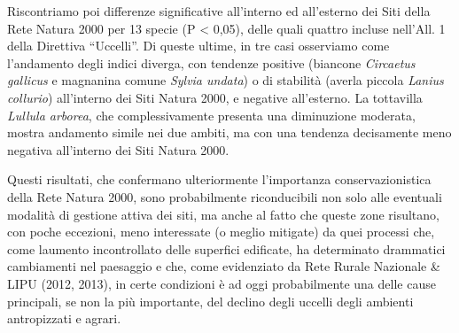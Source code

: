 Riscontriamo poi differenze significative all{\textquoteright}interno ed
all{\textquoteright}esterno dei Siti della Rete Natura 2000 per 13
specie (P {\textless} 0,05), delle quali quattro incluse
nell{\textquoteright}All. 1 della Direttiva
{\textquotedblleft}Uccelli{\textquotedblright}. Di queste ultime, in
tre casi osserviamo come l{\textquoteright}andamento degli indici
diverga, con tendenze positive (biancone \textit{Circaetus gallicus} e
magnanina comune \textit{Sylvia undata}) o di stabilit\`a (averla
piccola \textit{Lanius collurio}) all{\textquoteright}interno dei Siti
Natura 2000, e negative all{\textquoteright}esterno. La tottavilla
\textit{Lullula arborea}, che complessivamente presenta una diminuzione
moderata, mostra andamento simile nei due ambiti, ma con una tendenza
decisamente meno negativa all{\textquoteright}interno dei Siti Natura
2000.

Questi risultati, che confermano ulteriormente
l{\textquoteright}importanza conservazionistica della Rete Natura 2000,
sono probabilmente riconducibili non solo alle eventuali modalit\`a di
gestione attiva dei siti, ma anche al fatto che queste zone risultano,
con poche eccezioni, meno interessate (o meglio mitigate) da quei
processi che, come l{\textquotesingle}aumento incontrollato delle
superfici edificate, ha determinato drammatici cambiamenti nel
paesaggio e che, come evidenziato da Rete Rurale Nazionale \& LIPU
(2012, 2013), in certe condizioni \`e ad oggi probabilmente una delle
cause principali, se non la pi\`u importante, del declino degli uccelli
degli ambienti antropizzati e agrari.


